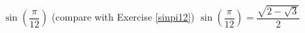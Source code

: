 {$\sin\left( \dfrac{\pi}{12} \right)$  (compare with Exercise \ref{sinpi12})}
{$\sin\left( \dfrac{\pi}{12} \right) = \dfrac{\sqrt{2-\sqrt{3}}}{2}$ }
